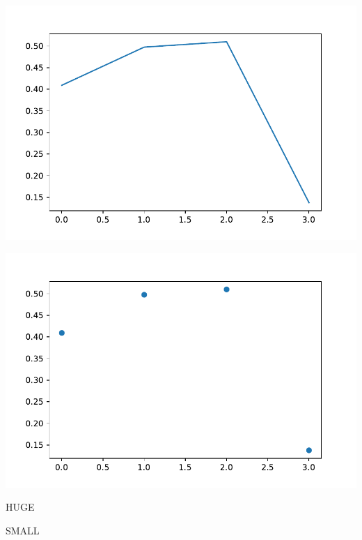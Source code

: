 \documentclass{beamer}
\begin{document}
    \begin{frame}
        \begin{minipage}{0.49\textwidth}
            \includegraphics[width=\textwidth]{lineplot.pdf} 
        \end{minipage}
        \begin{minipage}{0.49\textwidth}
            \includegraphics[width=\textwidth]{scatter.pdf}
        \end{minipage}
    \end{frame}

    \begin{frame}
        \begin{minipage}{0.49\textwidth}
            \centering
            \Huge HUGE
        \end{minipage}
        \pause
        \vspace{1cm}
        \begin{minipage}{0.49\textwidth}
            \centering
            \small SMALL
        \end{minipage}
    \end{frame}
\end{document}
